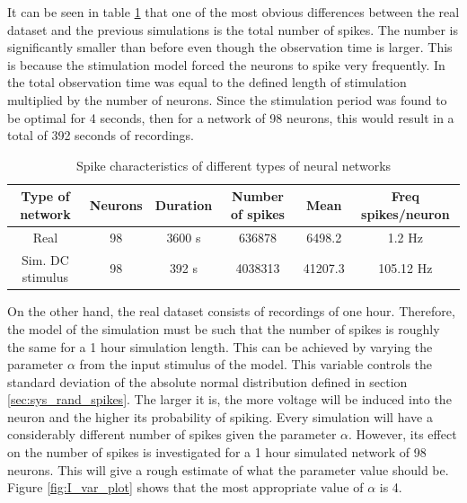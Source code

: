 It can be seen in table \ref{tab:spike_characteristics} that one of the most obvious differences between the real dataset and the previous simulations is the total number of spikes. The number is significantly smaller than before even though the observation time is larger. This is because the stimulation model forced the neurons to spike very frequently. In \cite{alexandru2018estimating} the total observation time was equal to the defined length of stimulation multiplied by the number of neurons. Since the stimulation period was found to be optimal for 4 seconds, then for a network of 98 neurons, this would result in a total of 392 seconds of recordings. \\ 

\begin{table}[]
\centering
\begin{tabular}{|c|c|c|c|c|c|}
\hline
Type of network  & Neurons & Duration & Number of spikes & Mean    & Freq spikes/neuron \\ \hline
Real             & 98                & 3600 s           & 636878           & 6498.2  & 1.2 Hz               \\ \hline
Sim. DC stimulus & 98                & 392 s            & 4038313          & 41207.3 & 105.12 Hz            \\ \hline
\end{tabular}
\caption{Spike characteristics of different types of neural networks}
\label{tab:spike_characteristics}
\end{table}

On the other hand, the real dataset consists of recordings of one hour. Therefore, the model of the simulation must be such that the number of spikes is roughly the same for a 1 hour simulation length. This can be achieved by varying the parameter \(\alpha\) from the input stimulus of the model. This variable controls the standard deviation of the absolute normal distribution defined in section \ref{sec:sys_rand_spikes}. The larger it is, the more voltage will be induced into the neuron and the higher its probability of spiking.
Every simulation will have a considerably different number of spikes given the parameter \(\alpha\). However, its effect on the number of spikes is investigated for a 1 hour simulated network of 98 neurons. This will give a rough estimate of what the parameter value should be. Figure \ref{fig:I_var_plot} shows that the most appropriate value of \(\alpha\) is 4. 

